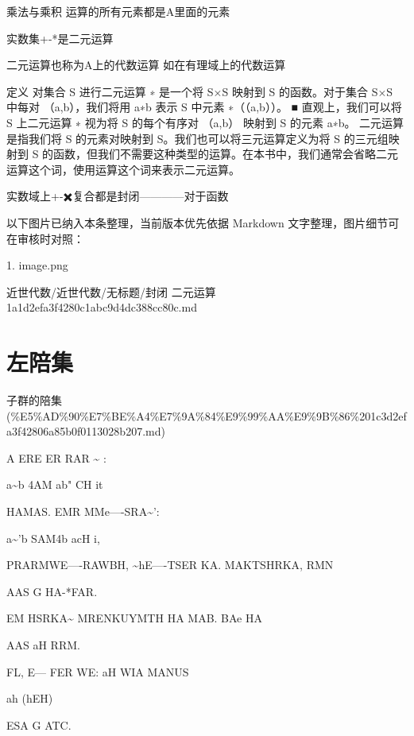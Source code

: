 \begin{note}[封闭 二元运算]

乘法与乘积 运算的所有元素都是A里面的元素

实数集+-*是二元运算

二元运算也称为A上的代数运算 如在有理域上的代数运算

定义 对集合 S 进行二元运算 ∗ 是一个将 S×S 映射到 S 的函数。对于集合 S×S 中每对 （a,b），我们将用 a∗b 表示 S 中元素 ∗（（a,b））。 ■ 直观上，我们可以将 S 上二元运算 ∗ 视为将 S 的每个有序对 （a,b） 映射到 S 的元素 a∗b。 二元运算是指我们将 S 的元素对映射到 S。我们也可以将三元运算定义为将 S 的三元组映射到 S 的函数，但我们不需要这种类型的运算。在本书中，我们通常会省略二元运算这个词，使用运算这个词来表示二元运算。

实数域上+-✖️复合都是封闭————对于函数

\end{note}

\begin{note}[关联图片]
以下图片已纳入本条整理，当前版本优先依据 Markdown 文字整理，图片细节可在审核时对照：

1. image.png\\

\end{note}

\begin{note}[来源路径]

近世代数/近世代数/无标题/封闭 二元运算 1a1d2efa3f4280c1abc9d4dc388cc80c.md

\end{note}

\section*{左陪集}

\begin{note}[来源上级主题]

子群的陪集 (\%E5\%AD\%90\%E7\%BE\%A4\%E7\%9A\%84\%E9\%99\%AA\%E9\%9B\%86\%201c3d2efa3f42806a85b0f0113028b207.md)

\end{note}

\begin{note}[左陪集]

A ERE ER RAR \textasciitilde{} :

a\textasciitilde{}b 4AM ab" CH it

HAMAS. EMR MMe—-SRA\textasciitilde{}’:

a\textasciitilde{}'b SAM4b acH i,

PRARMWE—-RAWBH, \textasciitilde{}hE—-TSER KA. MAKTSHRKA, RMN

AAS G HA-*FAR.

EM HSRKA\textasciitilde{} MRENKUYMTH HA MAB. BAe HA

AAS aH RRM.

FL, E— FER WE: aH WIA MANUS

ah (hEH)

ESA G ATC.

\end{note}


